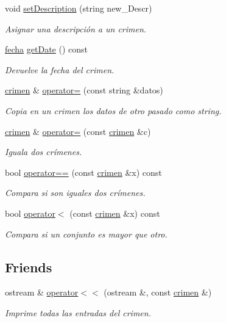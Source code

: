 \begin{DoxyCompactItemize}
void \hyperlink{classcrimen_aa2f141046bf44d87e5bc25ae197dcbd0}{set\+Description} (string new\+\_\+\+Descr)
\begin{DoxyCompactList}\small\item\em Asignar una descripción a un crimen. \end{DoxyCompactList}\item 
\hyperlink{classfecha}{fecha} \hyperlink{classcrimen_a8a6712e536211034819441ab87e1c215}{get\+Date} () const 
\begin{DoxyCompactList}\small\item\em Devuelve la fecha del crimen. \end{DoxyCompactList}\item 
\hyperlink{classcrimen}{crimen} \& \hyperlink{classcrimen_aaf1e77874a28ab1f2f5cd61efe386917}{operator=} (const string \&datos)
\begin{DoxyCompactList}\small\item\em Copia en un crimen los datos de otro pasado como string. \end{DoxyCompactList}\item 
\hyperlink{classcrimen}{crimen} \& \hyperlink{classcrimen_a612c4d3beaabd588703e4a580caf04e5}{operator=} (const \hyperlink{classcrimen}{crimen} \&c)
\begin{DoxyCompactList}\small\item\em Iguala dos crímenes. \end{DoxyCompactList}\item 
bool \hyperlink{classcrimen_aeced9ce4b7486123412975b8884d1ab7}{operator==} (const \hyperlink{classcrimen}{crimen} \&x) const 
\begin{DoxyCompactList}\small\item\em Compara si son iguales dos crímenes. \end{DoxyCompactList}\item 
bool \hyperlink{classcrimen_ac865fdb9712f2426d947b1b5546b50e5}{operator$<$} (const \hyperlink{classcrimen}{crimen} \&x) const 
\begin{DoxyCompactList}\small\item\em Compara si un conjunto es mayor que otro. \end{DoxyCompactList}\end{DoxyCompactItemize}
\subsection*{Friends}
\begin{DoxyCompactItemize}
\item 
ostream \& \hyperlink{classcrimen_a70d7dbf132d06cb3c889042765a7da2e}{operator$<$$<$} (ostream \&, const \hyperlink{classcrimen}{crimen} \&)
\begin{DoxyCompactList}\small\item\em Imprime todas las entradas del crimen. \end{DoxyCompactList}\end{DoxyCompactItemize}


